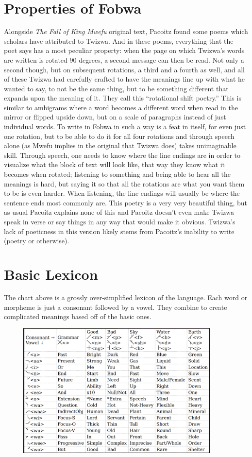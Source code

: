 \section{Properties of Fobwa}
\label{rotshift}
Alongside \emph{The Fall of King Mwefu} original text, Pacoitz found some poems which scholars have attributed to Twizwa. And in these poems, everything that the poet says has a most peculiar property: when the page on which Twizwa's words are written is rotated 90 degrees, a second message can then be read. Not only a second though, but on subsequent rotations, a third and a fourth as well, and all of these Twizwa had carefully crafted to have the meanings line up with what he wanted to say, to not be the same thing, but to be something different that expands upon the meaning of it. They call this ``rotational shift poetry.'' This is similar to ambigrams where a word becomes a different word when read in the mirror or flipped upside down, but on a scale of paragraphs instead of just individual words. To write in Fo\-bwa in such a way is a feat in itself, for even just one rotation, but to be able to do it for all four rotations and through speech alone (as Mwefu implies in the original that Twizwa does) takes unimaginable skill. Through speech, one needs to know where the line endings are in order to visualize what the block of text will look like, that way they know what it becomes when rotated; listening to something and being able to hear all the meanings is hard, but saying it so that all the rotations are what you want them to be is even harder. When listening, the line endings will usually be where the sentence ends most commonly are. This poetry is a very very beautiful thing, but as usual Pacoitz explains none of this and Pacoitz doesn't even make Twizwa speak in verse or say things in any way that would make it obvious. Twizwa's lack of poeticness in this version likely stems from Pacoitz's inability to write (poetry or otherwise).

\clearpage
\section{Basic Lexicon}
The chart above is a grossly over-simplified lexicon of the language. Each word or morpheme is just a consonant followed by a vowel. They combine to create complicated meanings based off of the basic ones.

\begin{figure}
\includegraphics[width=4.0in]{language.png}
\end{figure}
\clearpage

